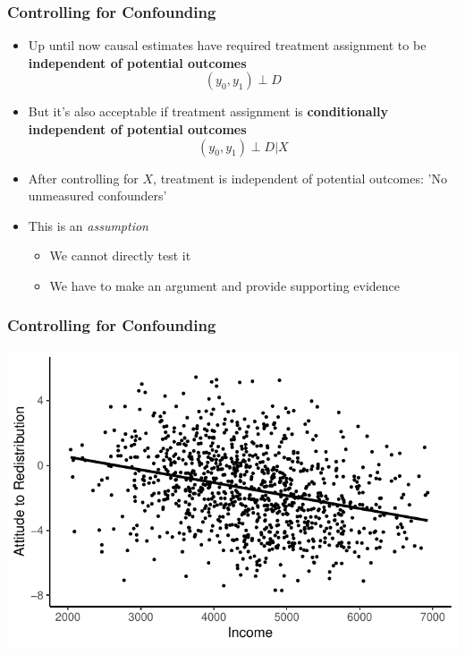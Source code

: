 \documentclass[xcolor=x11names,compress]{beamer}\usepackage[]{graphicx}\usepackage[]{color}
\makeatletter
\def\maxwidth{ %
  \ifdim\Gin@nat@width>\linewidth
    \linewidth
  \else
    \Gin@nat@width
  \fi
}
\newenvironment{knitrout}{}{} %
\renewcommand{\(}{\begin{columns}}
\renewcommand{\)}{\end{columns}}
\newcommand{\<}[1]{\begin{column}{#1}}
\renewcommand{\>}{\end{column}}
\makeatother
\begin{document}
\begin{frame}
\frametitle{Controlling for Confounding}
\begin{itemize}
\item Up until now causal estimates have required treatment assignment to be \textbf{independent of potential outcomes}
\pause
$$(y_0,y_1) \perp D$$
\pause
\item But it's also acceptable if treatment assignment is \textbf{conditionally independent of potential outcomes}
\pause
$$(y_0,y_1) \perp D | X$$
\pause
\item After controlling for $X$, treatment is independent of potential outcomes: 'No unmeasured confounders'
\pause
\item This is an \textit{assumption} 
\pause
\begin{itemize} 
\item We cannot directly test it
\pause
\item We have to make an argument and provide supporting evidence
\end{itemize}
\end{itemize}
\end{frame}



\begin{frame}
\frametitle{Controlling for Confounding}
\begin{knitrout}
\color{fgcolor}
\includegraphics[width=\maxwidth]{figure/confound0a-1} 

\end{knitrout}
\end{frame}
\end{document}
